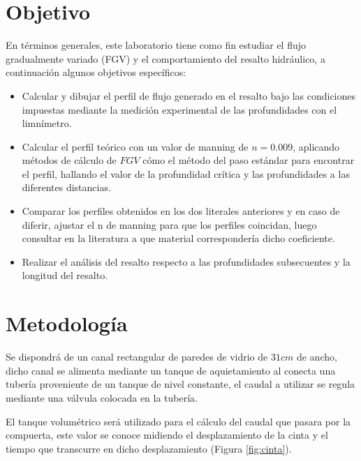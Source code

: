 \documentclass[10pt, a4paper]{exam}
\begin{document}
\section{Objetivo}

En términos generales, este laboratorio tiene como fin estudiar el flujo gradualmente variado (FGV) y el comportamiento del resalto hidráulico, a continuación algunos objetivos específicos:

\begin{itemize}

    \item Calcular y dibujar el perfil de flujo generado en el resalto bajo las condiciones impuestas mediante la medición experimental de las profundidades con el limnímetro.
    
    \item Calcular el perfil teórico con un valor de manning de $n=0.009$, aplicando métodos de cálculo de $FGV$ cómo el método del paso estándar para encontrar el perfil, hallando el valor de la profundidad crítica y las profundidades a las diferentes distancias.
    
    \item Comparar los perfiles obtenidos en los dos literales anteriores y en caso de diferir, ajustar el n de manning para que los perfiles coincidan, luego consultar en la literatura a que material correspondería dicho coeficiente.

    \item Realizar el análisis del resalto respecto a las profundidades subsecuentes y la longitud del resalto.
    
\end{itemize}


\section{Metodología}

Se dispondrá de un canal rectangular de paredes de vidrio de $31cm$ de ancho, dicho canal se alimenta mediante un tanque de aquietamiento al conecta una tubería proveniente de un tanque de nivel constante, el caudal a utilizar se regula mediante una válvula colocada en la tubería. \vspace{1ex}

El tanque volumétrico será utilizado para el cálculo del caudal que pasara por la compuerta, este valor se conoce midiendo el desplazamiento de la cinta y el tiempo que transcurre en dicho desplazamiento (Figura \ref{fig:cinta}). 
\end{document}
